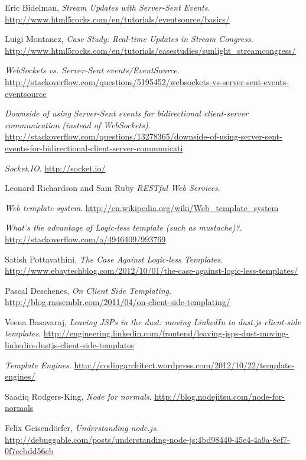 \documentclass[doc,helv,longtable]{article}
\begin{document}
\begin{thebibliography}{150}
  Eric Bidelman,
  \emph{Stream Updates with Server-Sent Events}.
  \url{http://www.html5rocks.com/en/tutorials/eventsource/basics/}

  Luigi Montanez,
  \emph{Case Study: Real-time Updates in Stream Congress}.
  \url{http://www.html5rocks.com/en/tutorials/casestudies/sunlight_streamcongress/}

  \emph{WebSockets vs. Server-Sent events/EventSource}.
  \url{http://stackoverflow.com/questions/5195452/websockets-vs-server-sent-events-eventsource}

  \emph{Downside of using Server-Sent events for bidirectional client-server communication (instead of WebSockets)}.
  \url{http://stackoverflow.com/questions/13278365/downside-of-using-server-sent-events-for-bidirectional-client-server-communicati}

  \emph{Socket.IO}.
  \url{http://socket.io/}

  Leonard Richardson and Sam Ruby
  \emph{RESTful Web Services}.

  \emph{Web template system}.
  \url{http://en.wikipedia.org/wiki/Web_template_system}

  \emph{What's the advantage of Logic-less template (such as mustache)?}.
  \url{http://stackoverflow.com/a/4946409/993769}

  Satish Pottavathini,
  \emph{The Case Against Logic-less Templates}.
  \url{http://www.ebaytechblog.com/2012/10/01/the-case-against-logic-less-templates/}

  Pascal Deschenes,
  \emph{On Client Side Templating}.
  \url{http://blog.rassemblr.com/2011/04/on-client-side-templating/}

  Veena Basavaraj,
  \emph{Leaving JSPs in the dust: moving LinkedIn to dust.js client-side templates}.
  \url{http://engineering.linkedin.com/frontend/leaving-jsps-dust-moving-linkedin-dustjs-client-side-templates}

  \emph{Template Engines}.
  \url{http://codingarchitect.wordpress.com/2012/10/22/template-engines/}

  Saadiq Rodgers-King,
  \emph{Node for normals}.
  \url{http://blog.nodejitsu.com/node-for-normals}

  Felix Geisendörfer,
  \emph{Understanding node.js}.
  \url{http://debuggable.com/posts/understanding-node-js:4bd98440-45e4-4a9a-8ef7-0f7ecbdd56cb}


\end{thebibliography}
\end{document}

